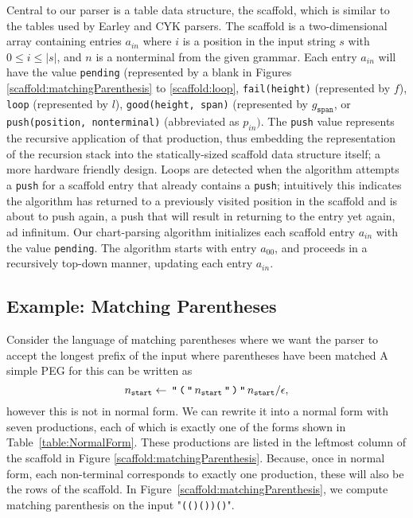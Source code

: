 Central to our parser is a table data structure,  the scaffold, which is
similar to the tables used by Earley and CYK parsers.  The scaffold is a
two-dimensional array containing entries $a_{in}$ where $i$ is a position
in the input string $s$ with $0\leq i\leq |s|$, and $n$ is a nonterminal
from the given grammar.  
Each entry $a_{in}$ will have the value {\tt pending} (represented by a blank in Figures \ref{scaffold:matchingParenthesis} to \ref{scaffold:loop}, {\tt fail(height)} (represented by $f$), {\tt loop} (represented by $l$), {\tt good(height, span)} (represented by $g_{\texttt{span}}$,  or
{\tt push(position, nonterminal)} (abbreviated as $p_{in})$\@.
The {\tt push} value represents the recursive application of that production, thus embedding the representation of the recursion stack into the statically-sized scaffold data structure itself; a more hardware friendly design. Loops are detected when the algorithm attempts a {\tt push} for a scaffold entry that already contains a {\tt push}; intuitively this indicates the algorithm has returned to a previously visited position in the scaffold and is about to push again, a push that will result in returning to the entry yet again, ad infinitum.  Our chart-parsing algorithm initializes each scaffold entry $a_{in}$ with the value \texttt{pending}. The algorithm starts with entry $a_{00}$, and proceeds in a recursively top-down manner, updating each entry $a_{in}$.


\subsection{Example: Matching Parentheses}

Consider the language of matching parentheses where we want the parser to accept
the longest prefix of the input where parentheses have been matched
A simple PEG for this can be written as
\[ n_{\texttt{start}} \leftarrow \,\texttt{"}\,\texttt{(}\,\texttt{"}\, n_{\texttt{start}} \,\texttt{"}\,\texttt{)}\,\texttt{"}\, n_{\texttt{start}} / \epsilon, \]
however this is not in normal form.  We can rewrite it into a normal form with seven productions, each of which is exactly one of the forms shown in Table~\ref{table:NormalForm}.  These productions are listed in the leftmost column of the scaffold in Figure \ref{scaffold:matchingParenthesis}.  Because, once in normal form, each non-terminal corresponds to exactly one production, these will also be the rows of the scaffold.  In Figure~\ref{scaffold:matchingParenthesis}, we compute matching parenthesis on the input "\texttt{(()())()}".

